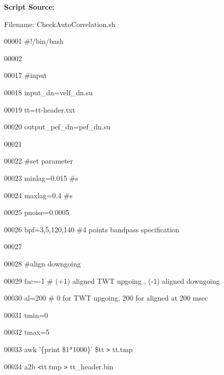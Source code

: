 \documentclass{article}
\begin{document}
\vspace{16pt}
\baselineskip=12pt
\leftskip=0pt
\textbf{Script Source:}

\vspace{4pt}
Filename: CheckAutoCorrelation.sh

\vspace{4pt}
00001 \#!/bin/bash

\vspace{4pt}
00002 

\vspace{4pt}
00017 \#input

\vspace{4pt}
00018 input\_dn=velf\_dn.su

\vspace{4pt}
00019 tt=tt-header.txt

\vspace{4pt}
00020 output\_pef\_dn=pef\_dn.su

\vspace{4pt}
00021 

\vspace{4pt}
00022 \#set parameter

\vspace{4pt}
00023 minlag=0.015 \#s

\vspace{4pt}
00024 maxlag=0.4 \#s

\vspace{4pt}
00025 pnoise=0.0005

\vspace{4pt}
00026 bpf=3,5,120,140 \#4 points bandpass specification

\vspace{4pt}
00027 

\vspace{4pt}
00028 \#align downgoing

\vspace{4pt}
00029 fac=-1 \# (+1) aligned TWT upgoing , (-1) aligned downgoing

\vspace{4pt}
00030 al=200 \# 0 for TWT upgoing, 200 for aligned at 200 msec

\vspace{4pt}
00031 tmin=0

\vspace{4pt}
00032 tmax=5

\vspace{4pt}
00033 awk '\{print \$1*1000\}' \$tt \texttt{>} tt.tmp 

\vspace{4pt}
00034 a2b \texttt{<}tt.tmp \texttt{>} tt\_header.bin
\end{document}

